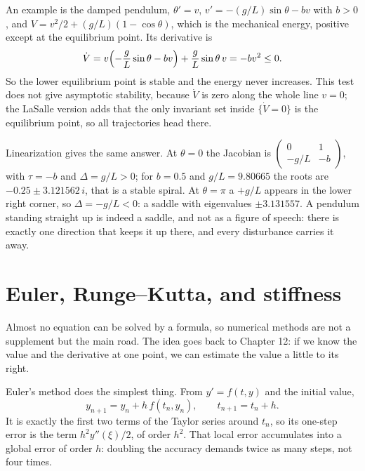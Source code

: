 An example is the damped pendulum, $\theta'=v$, $v'=-(g/L)\sin\theta-bv$ with
$b>0$, and $V=v^{2}/2+(g/L)(1-\cos\theta)$, which is the mechanical energy, positive
except at the equilibrium point. Its derivative is
\[
\dot V=v\Bigl(-\frac{g}{L}\sin\theta-bv\Bigr)+\frac{g}{L}\sin\theta\,v=-bv^{2}\le0 .
\]
So the lower equilibrium point is stable and the energy never increases. This test
does not give asymptotic stability, because $\dot V$ is zero along the whole line $v=0$;
the LaSalle version adds that the only invariant set inside $\{\dot V=0\}$ is the equilibrium
point, so all trajectories head there.

Linearization gives the same answer. At $\theta=0$ the Jacobian is
$\begin{pmatrix}0&1\\-g/L&-b\end{pmatrix}$, with $\tau=-b$ and
$\Delta=g/L>0$; for $b=0.5$ and $g/L=9.80665$ the roots are $-0.25\pm3.121562\,i$,
that is a stable spiral. At $\theta=\pi$ a $+g/L$ appears in the lower right corner,
so $\Delta=-g/L<0$: a saddle with eigenvalues $\pm3.131557$. A pendulum standing
straight up is indeed a saddle, and not as a figure of speech: there is exactly one direction
that keeps it up there, and every disturbance carries it away.



\section{Euler, Runge--Kutta, and stiffness}

Almost no equation can be solved by a formula, so numerical methods are not a supplement but
the main road. The idea goes back to Chapter 12: if we know the value and the derivative at
one point, we can estimate the value a little to its right.

Euler's method does the simplest thing. From $y'=f(t,y)$ and the initial value,
\[
y_{n+1}=y_{n}+h\,f(t_{n},y_{n}),\qquad t_{n+1}=t_{n}+h .
\]
It is exactly the first two terms of the Taylor series around $t_{n}$, so its one-step error
is the term $h^{2}y''(\xi)/2$, of order $h^{2}$. That local error accumulates into a global
error of order $h$: doubling the accuracy demands twice as many steps, not four times.

